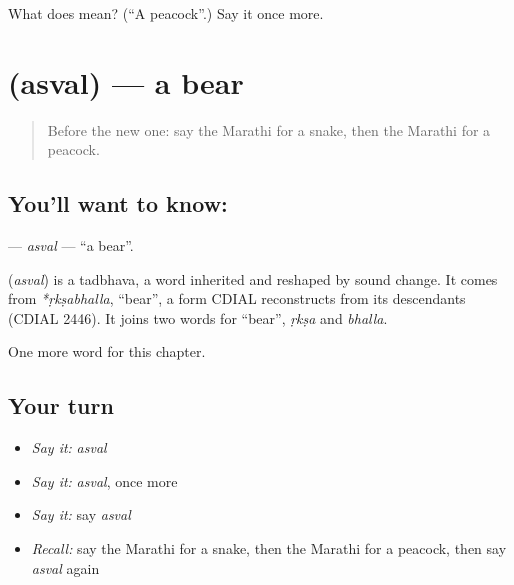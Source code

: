 \begin{tcolorbox}[breakable,colback=teal!4,colframe=teal!35!black,title={Before you move on}]
What does  mean? (\textquotedblleft{}A peacock\textquotedblright{}.) Say it once more.
\end{tcolorbox}
\section[\texorpdfstring{\mr{अस्वल} (asval)}{अस्वल (asval)}]{ (asval) — a bear}

\label{lesson:MR-C102-asval}



\begin{quote}
Before the new one: say the Marathi for a snake, then the Marathi for a peacock.
\end{quote}

\subsection*{You'll want to know: }
\textbf{} — \emph{asval} — \textquotedblleft{}a bear\textquotedblright{}.

\begin{cousinweb}
\textbf{} (\emph{asval}) is a tadbhava, a word inherited and reshaped by sound change. It comes from \emph{*ṛkṣabhalla}, \textquotedblleft{}bear\textquotedblright{}, a form CDIAL reconstructs from its descendants (CDIAL 2446). It joins two words for \textquotedblleft{}bear\textquotedblright{}, \emph{ṛkṣa} and \emph{bhalla}.
\end{cousinweb}

\begin{grammarlens}[title={What you've built}]
One more word for this chapter.
\end{grammarlens}

\subsection*{Your turn}
\begin{itemize}
\raggedright
  \item \emph{Say it:} \emph{asval}
  \item \emph{Say it:} \emph{asval}, once more
  \item \emph{Say it:} say \emph{asval}
  \item \emph{Recall:} say the Marathi for a snake, then the Marathi for a peacock, then say \emph{asval} again
\end{itemize}

